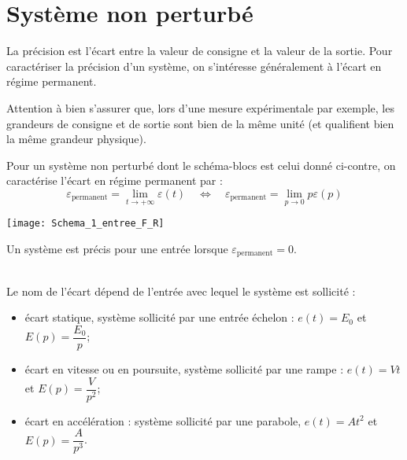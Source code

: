 \section{Système non perturbé}
\begin{defi}
La précision est l'écart entre la valeur de consigne et la valeur de la sortie. Pour caractériser la précision d'un système, on s'intéresse généralement à l'écart en régime permanent.

Attention à bien s'assurer que, lors d'une mesure expérimentale par exemple, les grandeurs de consigne et de sortie sont bien de la même unité (et qualifient bien la même grandeur physique).

\vspace{.2cm}

\noindent \begin{minipage}[c]{.6\linewidth}
Pour un système non perturbé dont le schéma-blocs est celui donné ci-contre, on caractérise l'écart en régime permanent par :
$$
\varepsilon_{\text{permanent}}=\lim\limits_{t\to +\infty} \varepsilon(t)
\quad
\Longleftrightarrow 
\quad
\varepsilon_{\text{permanent}}=\lim\limits_{p\to 0} p\varepsilon(p)
$$
\end{minipage}
\hspace{.5cm}
\begin{minipage}[c]{.25\linewidth}
%
\texttt{[image: Schema\_1\_entree\_F\_R]}
\end{minipage}

\end{defi}

\begin{defi}
Un système est précis pour une entrée lorsque $\varepsilon_{\text{permanent}}=0$.
\end{defi}

\begin{defi} \~\\
Le nom de l'écart dépend de l'entrée avec lequel le système est sollicité : 
\begin{itemize}
\item écart statique, système sollicité par une entrée échelon : $e(t)=E_0$ et $E(p)=\dfrac{E_0}{p}$;
\item écart en vitesse ou en poursuite, système sollicité par une rampe : $e(t)=Vt$ et $E(p)=\dfrac{V}{p^2}$;
\item écart en accélération : système sollicité par une parabole, $e(t)=At^2$ et $E(p)=\dfrac{A}{p^3}$.
\end{itemize}
\end{defi}

